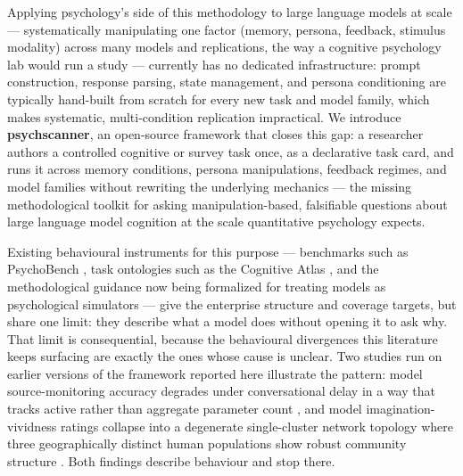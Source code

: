 \documentclass[pdflatex,sn-nature]{sn-jnl}
\begin{document}
Applying psychology's side of this methodology to large language models at
scale — systematically manipulating one factor (memory, persona, feedback,
stimulus modality) across many models and replications, the way a
cognitive psychology lab would run a study — currently has no dedicated
infrastructure: prompt construction, response parsing, state management,
and persona conditioning are typically hand-built from scratch for every
new task and model family, which makes systematic, multi-condition
replication impractical. We introduce \textbf{psychscanner}, an
open-source framework that closes this gap: a researcher authors a
controlled cognitive or survey task once, as a declarative task card, and
runs it across memory conditions, persona manipulations, feedback regimes,
and model families without rewriting the underlying mechanics — the
missing methodological toolkit for asking manipulation-based, falsifiable
questions about large language model cognition at the scale quantitative
psychology expects.

Existing behavioural instruments for this purpose — benchmarks such as
PsychoBench \citep{huang2024psychobench}, task ontologies such as the
Cognitive Atlas \citep{poldrack2011cogatlas}, and the methodological
guidance now being formalized for treating models as psychological
simulators \citep{lin2025simulators} — give the enterprise structure and
coverage targets, but share one limit: they describe what a model does
without opening it to ask why. That limit is consequential, because the
behavioural divergences this literature keeps surfacing are exactly the
ones whose cause is unclear. Two studies run on earlier versions of the
framework reported here illustrate the pattern: model source-monitoring
accuracy degrades under conversational delay in a way that tracks active
rather than aggregate parameter count \citep{ranjan2026reality}, and model
imagination-vividness ratings collapse into a degenerate single-cluster
network topology where three geographically distinct human populations show
robust community structure \citep{ranjan2025psychological}. Both findings
describe behaviour and stop there.
\end{document}
